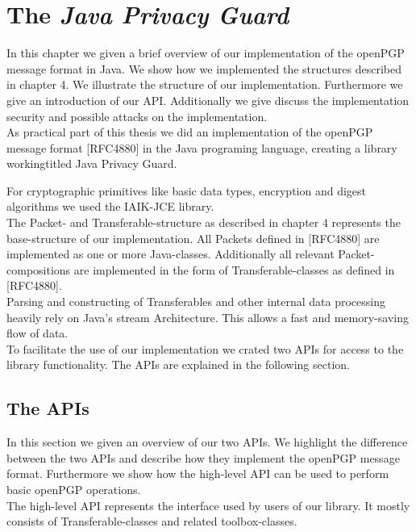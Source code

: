 \chapter{The \textit{Java Privacy Guard}} \label{chapter:jpg}

In this chapter we given a brief overview of our implementation of the openPGP message format in Java. We show how we implemented the structures described in chapter 4. We illustrate the structure of our implementation. Furthermore we give an introduction of our API.
Additionally we give discuss the implementation security and possible attacks on the implementation.  \\


As practical part of this thesis we did an implementation of the openPGP message format [RFC4880] in the Java programing language, creating a library workingtitled Java Privacy Guard.

For cryptographic primitives like basic data types, encryption and digest algorithms we used the IAIK-JCE library. \\

The Packet- and Transferable-structure as described in chapter 4 represents the base-structure of our implementation. All Packets defined in [RFC4880] are implemented as one or more Java-classes. Additionally all relevant Packet-compositions are implemented in the form of Transferable-classes as defined in [RFC4880]. \\

Parsing and constructing of Transferables and other internal data processing heavily rely on Java's stream Architecture. This allows a fast and memory-saving flow of data. \\

To facilitate the use of our implementation we crated two APIs for access to the library functionality. The APIs are explained in the following section.

\section{The APIs}

In this section we given an overview of our two APIs. We highlight the difference between the two APIs and describe how they implement the openPGP message format. Furthermore we show how the high-level API can be used to perform basic openPGP operations. \\

The high-level API represents the interface used by users of our library. It mostly consists of Transferable-classes and related toolbox-classes.

